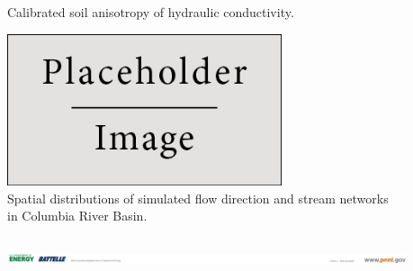 \documentclass[final]{beamer}
\newlength{\sepwid}
\newlength{\threecolwid}
\begin{document}
\begin{frame}[t]
\begin{columns}[t]
\begin{column}{\threecolwid}
\begin{minipage}[b][0.3\textheight][c]{0.4\textwidth}
\begin{figure}
            \caption{Calibrated soil anisotropy of hydraulic conductivity.}
            \label{fig:clm_structure}
          \end{figure}
        \end{minipage}

      \begin{figure}
        \includegraphics[width = 0.72\textwidth]{figure/placeholder.jpg}
        \caption{Spatial distributions of simulated flow direction and stream networks in Columbia River Basin.}
        \label{fig:cbc}
      \end{figure}
    \end{column} %
  \end{columns} %
  \vspace{0in}
  \begin{columns}[t]   
    \begin{column}{\sepwid}
    \end{column} %
    \begin{column}{\sepwid}
    \end{column} %
    \begin{column}{0.9\paperwidth}      
      \includegraphics[width=\textwidth,center]{figure/bottom_logo.png}     
    \end{column}   
    \begin{column}{\sepwid}
    \end{column} %
  \end{columns}
\end{frame} %
\end{document}
